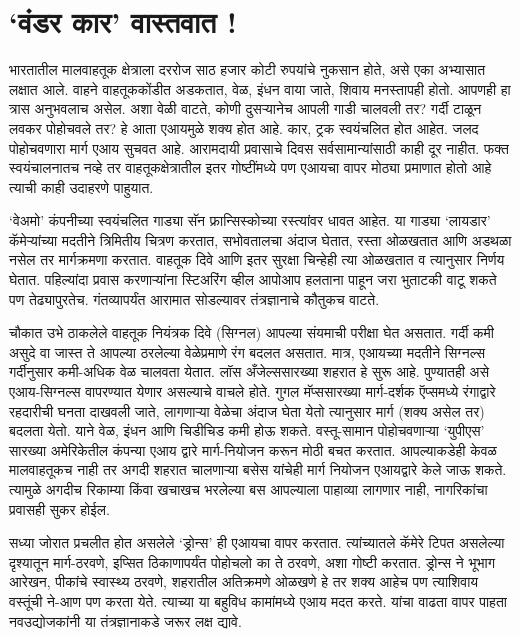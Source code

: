 \chapter{`वंडर कार' वास्तवात !}

भारतातील मालवाहतूक क्षेत्राला दररोज साठ हजार कोटी रुपयांचे नुकसान होते, असे एका अभ्यासात लक्षात आले. वाहने वाहतूककोंडीत अडकतात, वेळ, इंधन वाया जाते, शिवाय मनस्तापही होतो. आपणही हा त्रास अनुभवलाच असेल. अशा वेळी वाटते, कोणी दुसऱ्यानेच आपली गाडी चालवली तर? गर्दी टाळून लवकर पोहोचवले तर? हे आता एआयमुळे शक्य होत आहे. कार, ट्रक स्वयंचलित होत आहेत. जलद पोहोचवणारा मार्ग एआय सुचवत आहे. आरामदायी प्रवासाचे दिवस सर्वसामान्यांसाठी काही दूर नाहीत. फक्त स्वयंचालनातच नव्हे तर वाहतूकक्षेत्रातील इतर गोष्टींमध्ये पण एआयचा वापर मोठ्या प्रमाणात होतो आहे त्याची काही उदाहरणे पाहुयात.

`वेअमो' कंपनीच्या स्वयंचलित गाड्या सॅन फ्रान्सिस्कोच्या रस्त्यांवर धावत आहेत. या गाड्या `लायडार' कॅमेर्‍यांच्या मदतीने त्रिमितीय चित्रण करतात, सभोवतालचा अंदाज घेतात, रस्ता ओळखतात आणि अडथळा नसेल तर मार्गक्रमणा करतात. वाहतूक दिवे आणि इतर सुरक्षा चिन्हेही त्या ओळखतात व त्यानुसार निर्णय घेतात. पहिल्यांदा प्रवास करणाऱ्यांना स्टिअरिंग व्हील आपोआप हलताना पाहून जरा भुताटकी वाटू शकते पण तेढ्यापुरतेच. गंतव्यापर्यंत आरामात सोडल्यावर तंत्रज्ञानाचे कौतुकच वाटते.

चौकात उभे ठाकलेले वाहतूक नियंत्रक दिवे (सिग्नल) आपल्या संयमाची परीक्षा घेत असतात. गर्दी कमी असुदे वा जास्त ते आपल्या ठरलेल्या वेळेप्रमाणे रंग बदलत असतात. मात्र, एआयच्या मदतीने सिग्नल्स गर्दीनुसार कमी-अधिक वेळ चालवता येतात. लॉस अँजेल्ससारख्या शहरात हे सुरू आहे. पुण्यातही असे एआय-सिग्नल्स वापरण्यात येणार असल्याचे वाचले होते. गुगल मॅप्ससारख्या मार्ग-दर्शक ऍप्समध्ये रंगाद्वारे रहदारीची घनता दाखवली जाते, लागणाऱ्या वेळेचा अंदाज घेता येतो त्यानुसार मार्ग (शक्य असेल तर) बदलता येतो. याने वेळ, इंधन आणि चिडीचिड कमी होऊ शकते. वस्तू-सामान पोहोचवणाऱ्या `युपीएस' सारख्या अमेरिकेतील कंपन्या एआय द्वारे मार्ग-नियोजन करून मोठी बचत करतात. आपल्याकडेही केवळ मालवाहतूकच नाही तर अगदी शहरात चालणाऱ्या बसेस यांचेही मार्ग नियोजन एआयद्वारे केले जाऊ शकते. त्यामुळे अगदीच रिकाम्या किंवा खचाखच भरलेल्या बस आपल्याला पाहाव्या लागणार नाही, नागरिकांचा प्रवासही सुकर होईल.

सध्या जोरात प्रचलीत होत असलेले `ड्रोन्स' ही एआयचा वापर करतात. त्यांच्यातले कॅमेरे टिपत असलेल्या दृश्यातून मार्ग-ठरवणे, इप्सित ठिकाणापर्यंत पोहोचलो का ते ठरवणे, अशा गोष्टी करतात. ड्रोन्स ने भूभाग आरेखन, पीकांचे स्वास्थ्य ठरवणे, शहरातील अतिक्रमणे ओळखणे हे तर शक्य आहेच पण त्याशिवाय वस्तूंची ने-आण पण करता येते. त्याच्या या बहुविध कामांमध्ये एआय मदत करते. यांचा वाढता वापर पाहता नवउद्योजकांनी या तंत्रज्ञानाकडे जरूर लक्ष द्यावे.

